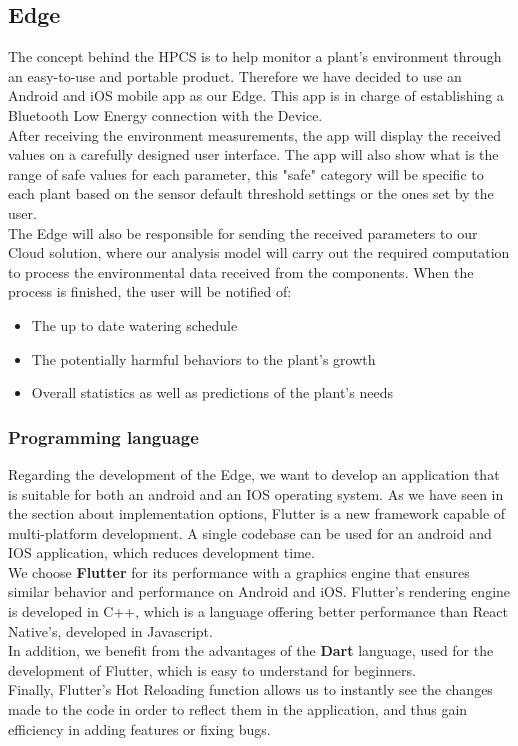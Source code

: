 \subsection{Edge}
The concept behind the HPCS is to help monitor a plant's environment through an
easy-to-use and portable product. Therefore we have decided to use an Android and
iOS mobile app as our Edge. This app is in charge of establishing a Bluetooth Low
Energy connection with the Device. \\
After receiving the environment measurements, the app will display the received
values on a carefully designed user interface. The app will also show what is the
range of safe values for each parameter, this "safe" category will be specific to
each plant based on the sensor default threshold settings or the ones set by the user. \\
The Edge will also be responsible for sending the received parameters to our Cloud
solution, where our analysis model will carry out the required computation to process
the environmental data received from the components. When the process is finished,
the user will be notified of:
\begin{itemize}
    \item The up to date watering schedule
    \item The potentially harmful behaviors to the plant's growth
    \item Overall statistics as well as predictions of the plant's needs\\
\end{itemize}

\subsubsection*{Programming language}
Regarding the development of the Edge, we want to develop an application that is
suitable for both an android and an IOS operating system. As we have seen in the
section about implementation options, Flutter is a new framework capable of multi-platform
development. A single codebase can be used for an android and IOS application, which reduces
development time. \\
We choose \textbf{Flutter} for its performance with a graphics engine that ensures
similar behavior and performance on Android and iOS. Flutter's rendering engine
is developed in C++, which is a language offering better performance than React Native's,
developed in Javascript. \\
In addition, we benefit from the advantages of the \textbf{Dart} language, used
for the development of Flutter, which is easy to understand for beginners. \\
Finally, Flutter's Hot Reloading function allows us to instantly see the changes
made to the code in order to reflect them in the application, and thus gain efficiency
in adding features or fixing bugs.\\

